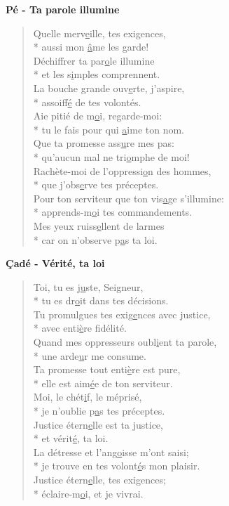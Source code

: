\textbf{Pé - Ta parole illumine}
\begin{verse}
Quelle merv\underline{e}ille, tes exigences, \\*
aussi mon \underline{â}me les garde! \\
Déchiffrer ta par\underline{o}le illumine \\*
et les s\underline{i}mples comprennent. \\
La bouche grande ouv\underline{e}rte, j’aspire, \\*
assoiff\underline{é} de tes volontés. \\
Aie pitié de m\underline{o}i, regarde-moi: \\*
tu le fais pour qui \underline{a}ime ton nom. \\
Que ta promesse ass\underline{u}re mes pas: \\*
qu’aucun mal ne tri\underline{o}mphe de moi! \\
Rachète-moi de l’oppressi\underline{o}n des hommes, \\*
que j’obs\underline{e}rve tes préceptes. \\
Pour ton serviteur que ton vis\underline{a}ge s’illumine: \\*
apprends-m\underline{o}i tes commandements. \\
Mes yeux ruiss\underline{e}llent de larmes \\*
car on n’observe p\underline{a}s ta loi. \\
\end{verse}
\textbf{Çadé - Vérité, ta loi}
\begin{verse}
Toi, tu es j\underline{u}ste, Seigneur, \\*
tu es dr\underline{o}it dans tes décisions. \\
Tu promulgues tes exig\underline{e}nces avec justice, \\*
avec enti\underline{è}re fidélité. \\
Quand mes oppresseurs oubl\underline{i}ent ta parole, \\*
une arde\underline{u}r me consume. \\
Ta promesse tout enti\underline{è}re est pure, \\*
elle est aim\underline{é}e de ton serviteur. \\
Moi, le chét\underline{i}f, le méprisé, \\*
je n’oublie p\underline{a}s tes préceptes. \\
Justice étern\underline{e}lle est ta justice, \\*
et vérit\underline{é}, ta loi. \\
La détresse et l’ang\underline{o}isse m’ont saisi; \\*
je trouve en tes volont\underline{é}s mon plaisir. \\
Justice étern\underline{e}lle, tes exigences; \\*
éclaire-m\underline{o}i, et je vivrai. \\
\end{verse}
